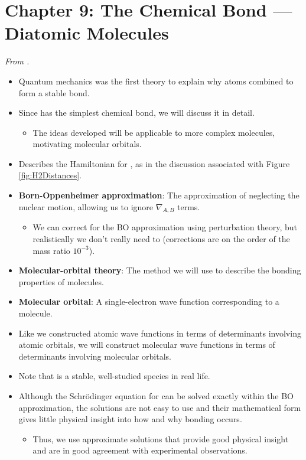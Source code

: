 \documentclass[../notes.tex]{subfiles}
\begin{document}
\section{Chapter 9: The Chemical Bond --- Diatomic Molecules}
\emph{From \textcite{bib:McQuarrieSimon}.}
\begin{itemize}
    \item {}Quantum mechanics was the first theory to explain why atoms combined to form a stable bond.
    \item Since  has the simplest chemical bond, we will discuss it in detail.
    \begin{itemize}
        \item The ideas developed will be applicable to more complex molecules, motivating molecular orbitals.
    \end{itemize}
    \item Describes the Hamiltonian for , as in the discussion associated with Figure \ref{fig:H2Distances}.
    \item \textbf{Born-Oppenheimer approximation}: The approximation of neglecting the nuclear motion, allowing us to ignore $\nabla_{A,B}$ terms.
    \begin{itemize}
        \item We can correct for the BO approximation using perturbation theory, but realistically we don't really need to (corrections are on the order of the mass ratio $10^{-3}$).
    \end{itemize}
    \item \textbf{Molecular-orbital theory}: The method we will use to describe the bonding properties of molecules.
    \item \textbf{Molecular orbital}: A single-electron wave function corresponding to a molecule.
    \item Like we constructed atomic wave functions in terms of determinants involving atomic orbitals, we will construct molecular wave functions in terms of determinants involving molecular orbitals.
    \item Note that  is a stable, well-studied species in real life.
    \item Although the Schr\"{o}dinger equation for  can be solved exactly within the BO approximation, the solutions are not easy to use and their mathematical form gives little physical insight into how and why bonding occurs.
    \begin{itemize}
        \item Thus, we use approximate solutions that provide good physical insight and are in good agreement with experimental observations.

\end{itemize}
\end{itemize}
\end{document}
